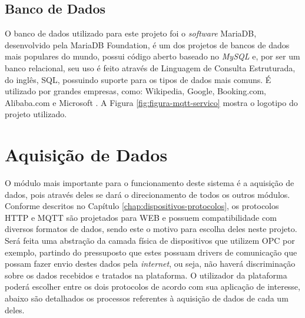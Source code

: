         \subsection{Banco de Dados}
        \label{sec:banco-dados}
        O banco de dados utilizado para este projeto foi o \textit{software} MariaDB, desenvolvido pela MariaDB Foundation, é um dos projetos de bancos de dados mais populares do mundo, possui código aberto baseado no \textit{MySQL} e, por ser um banco relacional, seu uso é feito através de Linguagem de Consulta Estruturada, do inglês, \gls{SQL}, possuindo suporte para os tipos de dados mais comuns. É utilizado por grandes empresas, como: Wikipedia, Google, Booking.com, Alibaba.com e Microsoft \cite{MariaDB}. A Figura \ref{fig:figura-mqtt-servico} mostra o logotipo do projeto utilizado.
        
        \begin{figure}[!h]
    	\end{figure}
    	
\section{Aquisição de Dados}
\label{sec:aquisicao-dados}
O módulo mais importante para o funcionamento deste sistema é a aquisição de dados, pois através deles se dará o direcionamento de todos os outros módulos. Conforme descritos no Capítulo \ref{chap:dispositivos-protocolos}, os protocolos \gls{HTTP} e \gls{MQTT} são  projetados para \gls{WEB} e possuem compatibilidade com diversos formatos de dados, sendo este o motivo para escolha deles neste projeto. Será feita uma abstração da camada física de dispositivos que utilizem \gls{OPC} por exemplo, partindo do pressuposto que estes possuam drivers de comunicação que possam fazer envio destes dados pela \textit{internet}, ou seja, não haverá discriminação sobre os dados recebidos e tratados na plataforma. O utilizador da plataforma poderá escolher entre os dois protocolos de acordo com sua aplicação de interesse, abaixo são detalhados os processos referentes à aquisição de dados de cada um deles.

